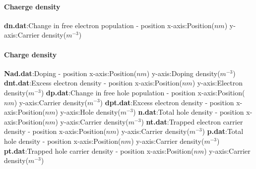 \paragraph{Chaerge density}
\textbf{dn.dat}:Change in free electron population - position\newline
x-axis:Position($nm$)\newline
y-axis:Carrier density($m^{-3}$)\newline
\newline
\paragraph{Charge density}
\textbf{Nad.dat}:Doping - position\newline
x-axis:Position($nm$)\newline
y-axis:Doping density($m^{-3}$)\newline
\newline
\textbf{dnt.dat}:Excess electron density - position\newline
x-axis:Position($nm$)\newline
y-axis:Electron density($m^{-3}$)\newline
\newline
\textbf{dp.dat}:Change in free hole population - position\newline
x-axis:Position($nm$)\newline
y-axis:Carrier density($m^{-3}$)\newline
\newline
\textbf{dpt.dat}:Excess electron density - position\newline
x-axis:Position($nm$)\newline
y-axis:Hole density($m^{-3}$)\newline
\newline
\textbf{n.dat}:Total hole density - position\newline
x-axis:Position($nm$)\newline
y-axis:Carrier density($m^{-3}$)\newline
\newline
\textbf{nt.dat}:Trapped electron carrier density - position\newline
x-axis:Position($nm$)\newline
y-axis:Carrier density($m^{-3}$)\newline
\newline
\textbf{p.dat}:Total hole density - position\newline
x-axis:Position($nm$)\newline
y-axis:Carrier density($m^{-3}$)\newline
\newline
\textbf{pt.dat}:Trapped hole carrier density - position\newline
x-axis:Position($nm$)\newline
y-axis:Carrier density($m^{-3}$)\newline
\newline
